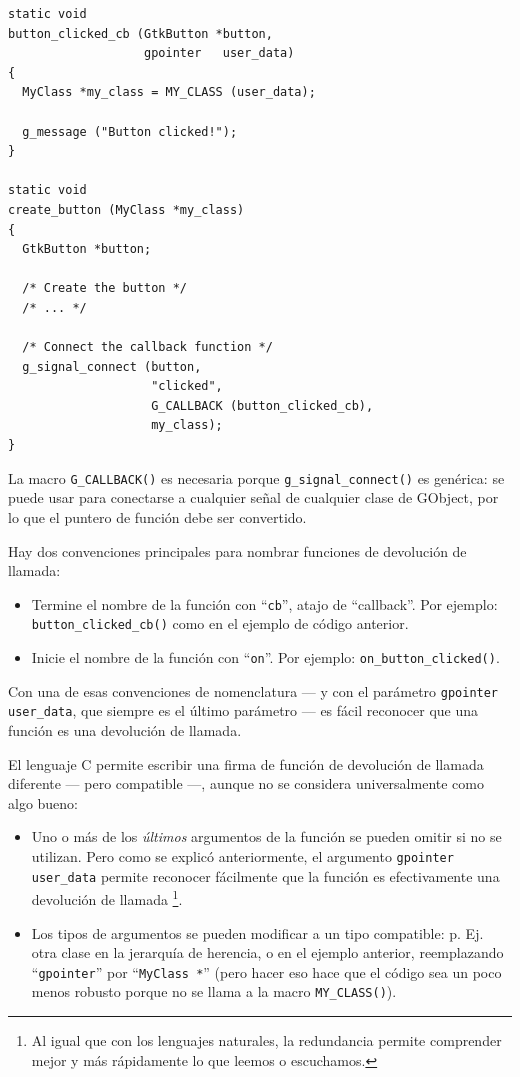 \begin{lstlisting}[float, caption={Cómo conectarse a una señal}, label=oop-gobject-connect-to-signal]
static void
button_clicked_cb (GtkButton *button,
                   gpointer   user_data)
{
  MyClass *my_class = MY_CLASS (user_data);

  g_message ("Button clicked!");
}

static void
create_button (MyClass *my_class)
{
  GtkButton *button;

  /* Create the button */
  /* ... */

  /* Connect the callback function */
  g_signal_connect (button,
                    "clicked",
                    G_CALLBACK (button_clicked_cb),
                    my_class);
}
\end{lstlisting}

La macro \lstinline{G_CALLBACK()} es necesaria porque \lstinline{g_signal_connect()} es genérica: se puede usar para conectarse a cualquier señal de cualquier clase de GObject, por lo que el puntero de función debe ser convertido.

Hay dos convenciones principales para nombrar funciones de devolución de llamada:
\begin{itemize}
  \item Termine el nombre de la función con ``\lstinline{cb}'', atajo de ``callback''. Por ejemplo: \lstinline{button_clicked_cb()} como en el ejemplo de código anterior.
  \item Inicie el nombre de la función con ``\lstinline{on}''. Por ejemplo: \lstinline{on_button_clicked()}.
\end{itemize}

Con una de esas convenciones de nomenclatura --- y con el parámetro \lstinline{gpointer user_data}, que siempre es el último parámetro --- es fácil reconocer que una función es una devolución de llamada.

El lenguaje C permite escribir una firma de función de devolución de llamada diferente --- pero compatible ---, aunque no se considera universalmente como algo bueno:
\begin{itemize}
  \item Uno o más de los \emph{últimos} argumentos de la función se pueden omitir si no se utilizan. Pero como se explicó anteriormente, el argumento \lstinline{gpointer user_data} permite reconocer fácilmente que la función es efectivamente una devolución de llamada \footnote{Al igual que con los lenguajes naturales, la redundancia permite comprender mejor y más rápidamente lo que leemos o escuchamos.}.
  \item Los tipos de argumentos se pueden modificar a un tipo compatible: p. Ej. otra clase en la jerarquía de herencia, o en el ejemplo anterior, reemplazando ``\lstinline{gpointer}'' por ``\lstinline{MyClass *}'' (pero hacer eso hace que el código sea un poco menos robusto porque no se llama a la macro \lstinline{MY_CLASS()}).
\end{itemize}

